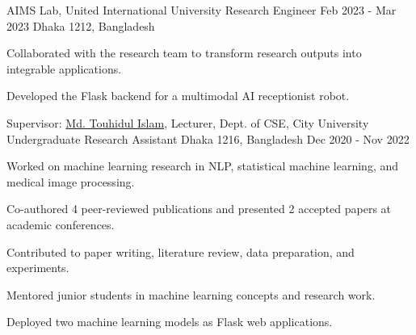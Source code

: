 \begin{cventries}


\cventry
  {AIMS Lab, United International University} %
  {Research Engineer} %
  {Feb 2023 - Mar 2023} %
  {Dhaka 1212, Bangladesh} %
{
  \begin{cvitems}
    \item{Collaborated with the research team to transform research outputs into integrable applications.}
    \item{Developed the Flask backend for a multimodal AI receptionist robot.}
  \end{cvitems}
}


\cventry
  {Supervisor: \href{https://www.linkedin.com/in/touhid000/}{Md. Touhidul Islam}, Lecturer, Dept. of CSE, City University} %
  {Undergraduate Research Assistant} %
  {Dhaka 1216, Bangladesh} %
  {Dec 2020 - Nov 2022} %
  {
    \begin{cvitems} %
      \item{Worked on machine learning research in NLP, statistical machine learning, and medical image processing.}
      \item{Co-authored 4 peer-reviewed publications and presented 2 accepted papers at academic conferences.}
      \item{Contributed to paper writing, literature review, data preparation, and experiments.}
      \item{Mentored junior students in machine learning concepts and research work.}
      \item{Deployed two machine learning models as Flask web applications.}
    \end{cvitems}
  }
  

\end{cventries}
